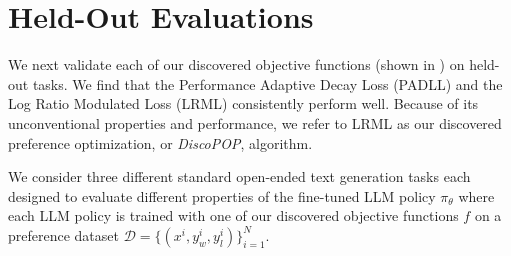 \documentclass{article}
\theoremstyle{plain}
\theoremstyle{definition}
\theoremstyle{remark}
\newcommand{\alex}[1]{{\color{green!90} Alex: #1}}
\begin{document}

\section{Held-Out Evaluations}
\label{held-out-tasks}
We next validate each of our discovered objective functions (shown in ) on held-out tasks.
We find that the Performance Adaptive Decay Loss (PADLL) and the Log Ratio Modulated Loss (LRML) consistently perform well. Because of its unconventional properties and performance, we refer to LRML as our discovered preference optimization, or \textit{DiscoPOP}, algorithm.

We consider three different standard \citep{rafailov2023direct} open-ended text generation tasks each designed to evaluate different properties of the fine-tuned LLM policy $\pi_\theta$ where each LLM policy is trained with one of our discovered objective functions $f$ on a preference dataset $\mathcal{D} = \{(x^i,y_w^i, y_l^i)\}_{i=1}^N$.
\end{document}
